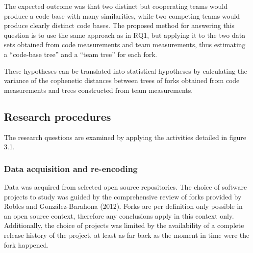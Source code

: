 The expected outcome was that two distinct but cooperating teams would produce a code base with many similarities, while two competing teams would produce clearly distinct code bases. The proposed method for answering this question is to use the same approach as in RQ1, but applying it to the two data sets obtained from code measurements and team measurements, thus estimating a “code-base tree” and a “team tree” for each fork. 



\noindent
These hypotheses can be translated into statistical hypotheses by calculating the variance of the cophenetic distances between trees of forks obtained from code measurements and trees constructed from team measurements.



\subsection{Research procedures}
The research questions are examined by applying the activities detailed in figure 3.1.

\subsubsection{Data acquisition and re-encoding}
Data was acquired from selected open source repositories. The choice of software projects to study was guided by the comprehensive review of forks provided by Robles and González-Barahona (2012). Forks are per definition only possible in an open source context, therefore any conclusions apply in this context only. Additionally, the choice of projects was limited by the availability of a complete release history of the project, at least as far back as the moment in time were the fork happened.

